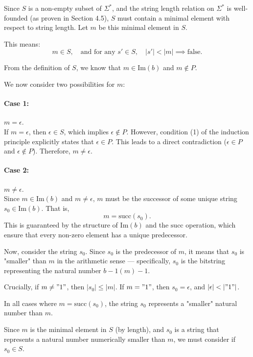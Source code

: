 \documentclass[12pt, a4paper]{article}
\begin{document}
Since \( S \) is a non-empty subset of \( \Sigma^* \), and the string length relation on \( \Sigma^* \) is well-founded (as proven in Section 4.5), \( S \) must contain a minimal element with respect to string length. Let \( m \) be this minimal element in \( S \). 

This means:
\[
m \in S, \quad \text{and for any } s' \in S, \quad |s'| < |m| \implies \text{false}.
\]

From the definition of \( S \), we know that \( m \in \mathrm{Im}(b) \) and \( m \notin P \).

We now consider two possibilities for \( m \):

\paragraph{Case 1:} \( m = \epsilon \). \\
If \( m = \epsilon \), then \( \epsilon \in S \), which implies \( \epsilon \notin P \). However, condition (1) of the induction principle explicitly states that \( \epsilon \in P \). This leads to a direct contradiction (\( \epsilon \in P \) and \( \epsilon \notin P \)). Therefore, \( m \neq \epsilon \).

\paragraph{Case 2:} \( m \neq \epsilon \). \\
Since \( m \in \mathrm{Im}(b) \) and \( m \neq \epsilon \), \( m \) must be the successor of some unique string \( s_0 \in \mathrm{Im}(b) \). That is,
\[
m = \mathrm{succ}(s_0).
\]
This is guaranteed by the structure of \(\mathrm{Im}(b)\) and the \(\mathrm{succ}\) operation, which ensure that every non-zero element has a unique predecessor.

Now, consider the string \( s_0 \). Since \( s_0 \) is the predecessor of \( m \), it means that \( s_0 \) is "smaller" than \( m \) in the arithmetic sense — specifically, \( s_0 \) is the bitstring representing the natural number \( b-1(m) - 1 \).

Crucially, if \( m \neq "1" \), then \( |s_0| \leq |m| \). If \( m = "1" \), then \( s_0 = \epsilon \), and \( |\epsilon| < |"1"| \).

In all cases where \( m = \mathrm{succ}(s_0) \), the string \( s_0 \) represents a "smaller" natural number than \( m \).

Since \( m \) is the minimal element in \( S \) (by length), and \( s_0 \) is a string that represents a natural number numerically smaller than \( m \), we must consider if \( s_0 \in S \).
\end{document}
